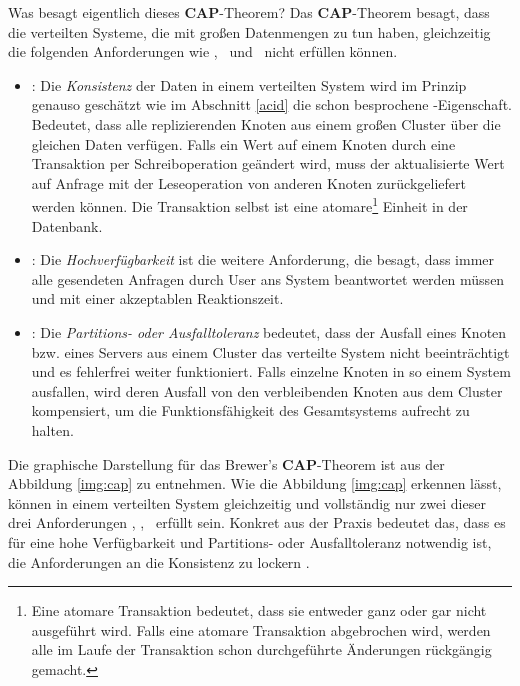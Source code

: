 Was besagt eigentlich dieses \textbf{CAP}-Theorem? Das \textbf{CAP}-Theorem besagt, dass die verteilten Systeme, die mit großen Datenmengen zu tun haben, gleichzeitig die folgenden Anforderungen wie \Cap, \cAp\ und \caP\ nicht erfüllen können.
\begin{itemize}
\item \Cap: Die \textit{Konsistenz} der Daten in einem verteilten System wird im Prinzip genauso geschätzt wie im Abschnitt \ref{acid} die schon besprochene \Acid-Eigenschaft. Bedeutet, dass alle replizierenden Knoten aus einem großen Cluster über die gleichen Daten verfügen. Falls ein Wert auf einem Knoten durch eine Transaktion per Schreiboperation geändert wird, muss der aktualisierte Wert auf Anfrage mit der Leseoperation von anderen Knoten zurückgeliefert werden können. Die Transaktion selbst ist eine atomare\footnote{Eine atomare Transaktion bedeutet, dass sie entweder ganz oder gar nicht ausgeführt wird. Falls eine atomare Transaktion abgebrochen wird, werden alle im Laufe der Transaktion schon durchgeführte Änderungen rückgängig gemacht.} Einheit in der Datenbank.

\item \cAp: Die \textit{Hochverfügbarkeit} ist die weitere Anforderung, die besagt, dass immer alle gesendeten Anfragen durch User ans System beantwortet werden müssen und mit einer akzeptablen Reaktionszeit.
\item \caP: Die \textit{Partitions- oder Ausfalltoleranz} bedeutet, dass der Ausfall eines Knoten bzw. eines Servers aus einem Cluster das verteilte System nicht beeinträchtigt und es fehlerfrei weiter funktioniert. Falls einzelne Knoten in so einem System ausfallen, wird deren Ausfall von den verbleibenden Knoten aus dem Cluster kompensiert, um die Funktionsfähigkeit des Gesamtsystems aufrecht zu halten.

\end{itemize}

Die graphische Darstellung für das Brewer's \textbf{CAP}-Theorem ist aus der Abbildung \ref{img:cap} zu entnehmen. Wie die Abbildung \ref{img:cap} erkennen lässt, können in einem verteilten System gleichzeitig und vollständig nur zwei dieser drei Anforderungen  \Cap, \cAp, \caP\ erfüllt sein. Konkret aus der Praxis bedeutet das, dass es für eine hohe Verfügbarkeit und Partitions- oder Ausfalltoleranz notwendig ist, die Anforderungen an die Konsistenz zu lockern \cite[S. 31]{Edlich.2011}.

